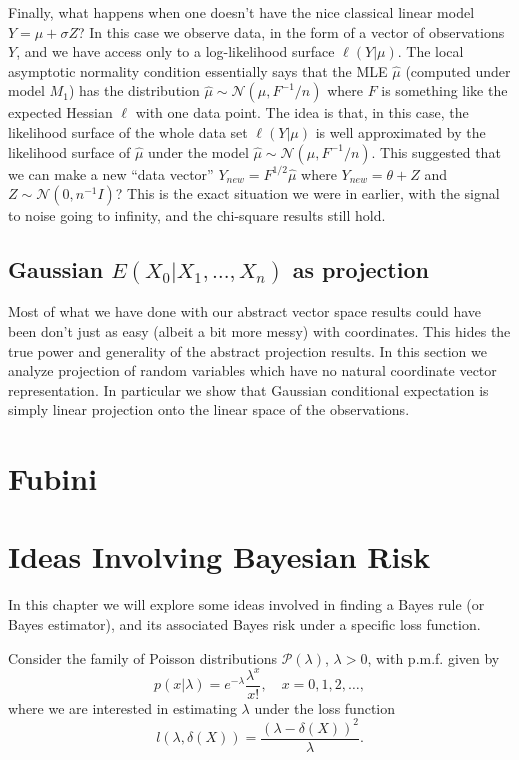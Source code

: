 \documentclass[11pt]{report}
\begin{document}
Finally, what happens when one doesn't have the nice classical linear model $Y = \mu + \sigma Z$? In this case we observe data, in the form of a vector of observations $Y$, and we have access only to a log-likelihood surface $\ell(Y|\mu)$. The local asymptotic normality condition essentially says that the MLE $\hat\mu$ (computed under model $M_1$) has the distribution $\hat\mu \sim \mathcal N(\mu, F^{-1}/n)$ where $F$ is something like the expected Hessian $\ell$ with one data point. The idea is that, in this case, the likelihood surface of the whole data set $\ell(Y|\mu)$ is well approximated by the likelihood surface of $\hat\mu$ under the model $\hat\mu \sim \mathcal N(\mu, F^{-1}/n)$. This suggested that we can make a new ``data vector'' $Y_{new} = F^{1/2}\hat\mu$ where $Y_{new}= \theta + Z$ and $Z\sim \mathcal N(0, n^{-1}I)$? This is the exact situation we were in earlier, with the signal to noise going to infinity, and the chi-square results still hold.

\section{Gaussian $E(X_0|X_1,\ldots, X_n)$ as projection}


Most of what we have done with our abstract vector space results could have been don't just as easy (albeit a bit more messy) with coordinates. This hides the true power and generality of the abstract projection results. In this section we analyze projection of random variables which have no natural coordinate vector representation. In particular we show that Gaussian conditional expectation is simply linear projection onto the linear space of the observations. 


\chapter{Fubini}

\chapter{Ideas Involving Bayesian Risk}

In this chapter we will explore some ideas involved in finding a Bayes rule (or Bayes estimator), and its associated Bayes risk under a specific loss function. 


Consider the family of Poisson distributions $\mathcal{P}(\lambda)$, $\lambda>0$, with p.m.f. given by 
$$p(x|\lambda) = e^{-\lambda}\frac{\lambda^x}{x!}, \quad x=0,1,2, \dots, $$
where we are interested in estimating $\lambda$ under the loss function
\begin{equation} \label{eq:loss}
l(\lambda,\delta(X)) = \frac{(\lambda-\delta(X))^2}{\lambda}.
\end{equation}
	
\end{document}
